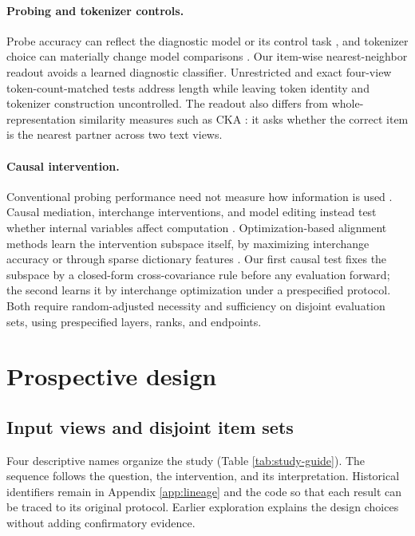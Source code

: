 \documentclass{article}
\begin{document}
\paragraph{Probing and tokenizer controls.}
Probe accuracy can reflect the diagnostic model or its control task
\citep{hewitt2019designing}, and tokenizer choice can materially change model
comparisons \citep{rust2021tokenizer}. Our item-wise nearest-neighbor readout
avoids a learned diagnostic classifier. Unrestricted and exact four-view
token-count-matched tests address length while leaving token identity and
tokenizer construction uncontrolled. The readout also differs from
whole-representation similarity measures such as CKA
\citep{kornblith2019similarity}: it asks whether the correct item is the
nearest partner across two text views.

\paragraph{Causal intervention.}
Conventional probing performance need not measure how information is used
\citep{elazar2021amnesic}. Causal mediation, interchange interventions, and
model editing instead test whether internal variables affect computation
\citep{vig2020causal,geiger2021causal,meng2022rome}. Optimization-based
alignment methods learn the intervention subspace itself, by maximizing
interchange accuracy \citep{geiger2024das,wu2023boundless} or through sparse
dictionary features \citep{bricken2023monosemanticity,cunningham2024sparse}.
Our first causal test fixes the subspace by a closed-form cross-covariance
rule before any evaluation forward; the second learns it by interchange
optimization under a prespecified protocol. Both require random-adjusted necessity
and sufficiency on disjoint evaluation sets, using prespecified layers,
ranks, and endpoints.

\section{Prospective design}
\label{sec:design}

\subsection{Input views and disjoint item sets}

Four descriptive names organize the study (Table \ref{tab:study-guide}).
The sequence follows the question, the intervention, and its interpretation.
Historical identifiers remain in Appendix \ref{app:lineage} and the code so
that each result can be traced to its original protocol. Earlier exploration
explains the design choices without adding confirmatory evidence.
\end{document}
